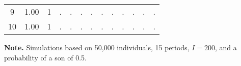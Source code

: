 \documentclass[12pt,letterpaper]{article}
\begin{document}
\begin{table}[!htp]
\begin{threeparttable}
\begin{tabular}{@{} c D{.}{.}{1.2} D{.}{.}{2.0} D{.}{.}{1.2} D{.}{.}{2.0} D{.}{.}{1.2} D{.}{.}{2.0} D{.}{.}{1.2} D{.}{.}{2.0} D{.}{.}{1.2} D{.}{.}{2.0} D{.}{.}{1.2} D{.}{.}{2.0} @{}}
 9             &  1.00 &     1 &     . &     . &     . &     . &     . &     . &     . &     . &     . &     . \\
 10            &  1.00 &     1 &     . &     . &     . &     . &     . &     . &     . &     . &     . &     . \\
\bottomrule
\end{tabular}
\begin{tablenotes} \tiny
\item \hspace*{-0.5em} \textbf{Note.} Simulations based on  50,000 individuals, 15 periods, $ I = 200 $,
 and a probability of a son of 0.5.
\end{tablenotes}
\end{threeparttable}
\normalsize
\end{table}
\end{document}
